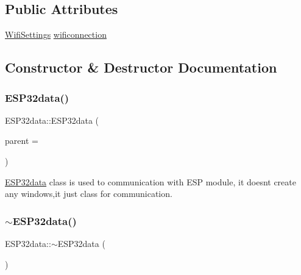 \subsection*{Public Attributes}
\begin{DoxyCompactItemize}
\item 
\hyperlink{struct_e_s_p32data_1_1_wifi_settings}{Wifi\+Settings} \hyperlink{class_e_s_p32data_af22a2683c01fae73c97eb0e03884675b}{wificonnection}
\end{DoxyCompactItemize}


\subsection{Constructor \& Destructor Documentation}
\mbox{\label{class_e_s_p32data_a23df6c4c56c578b115900d767280ed78}} 
\subsubsection{\texorpdfstring{E\+S\+P32data()}{ESP32data()}}
{\footnotesize\ttfamily E\+S\+P32data\+::\+E\+S\+P32data (\begin{DoxyParamCaption}\item[{Q\+Object $\ast$}]{parent = {} }\end{DoxyParamCaption})\hspace{0.3cm}{\ttfamily [explicit]}}



\hyperlink{class_e_s_p32data}{E\+S\+P32data} class is used to communication with E\+SP module, it doesn\textquotesingle{}t create any windows,it just class for communication. 

\mbox{\label{class_e_s_p32data_ae250e8a91371316a8104e65328cef89d}} 
\subsubsection{\texorpdfstring{$\sim$\+E\+S\+P32data()}{~ESP32data()}}
{\footnotesize\ttfamily E\+S\+P32data\+::$\sim$\+E\+S\+P32data (\begin{DoxyParamCaption}{ }\end{DoxyParamCaption})}



